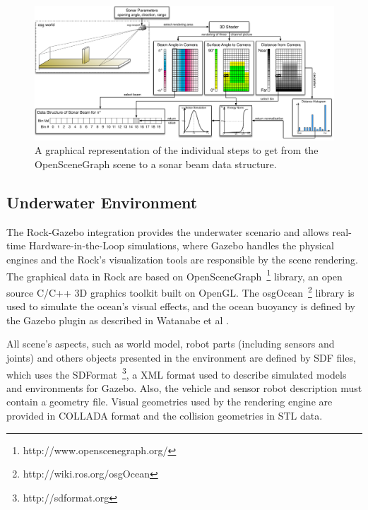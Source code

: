 \documentclass[final,5p,times]{elsarticle}
\begin{document}
\begin{figure}[!htb]
    \includegraphics[width=0.85\paperwidth]{figs/sonar_sim}
    \centering
    \captionsetup{justification=centering}
    \caption{A graphical representation of the individual steps to get from the OpenSceneGraph scene to a sonar beam data structure.}
    \label{fig:sonar_sim}
\end{figure}


\subsection{Underwater Environment}
\label{dev:uwscene}

The Rock-Gazebo integration \cite{watanabe2015} provides the underwater scenario and allows real-time Hardware-in-the-Loop simulations, where Gazebo handles the physical engines and the Rock's visualization tools are responsible by the scene rendering. The graphical data in Rock are based on OpenSceneGraph~\footnote{http://www.openscenegraph.org/} library, an open source C/C++ 3D graphics toolkit built on OpenGL. The osgOcean~\footnote{http://wiki.ros.org/osgOcean} library is used to simulate the ocean's visual effects, and the ocean buoyancy is defined by the Gazebo plugin as described in Watanabe et al \cite{watanabe2015}.

All scene's aspects, such as world model, robot parts (including sensors and joints) and others objects presented in the environment are defined by SDF files, which uses the SDFormat~\footnote{http://sdformat.org}, a XML format used to describe simulated models and environments for Gazebo. Also, the vehicle and sensor robot description must contain a geometry file. Visual geometries used by the rendering engine are provided in COLLADA format and the collision geometries in STL data.
\end{document}
